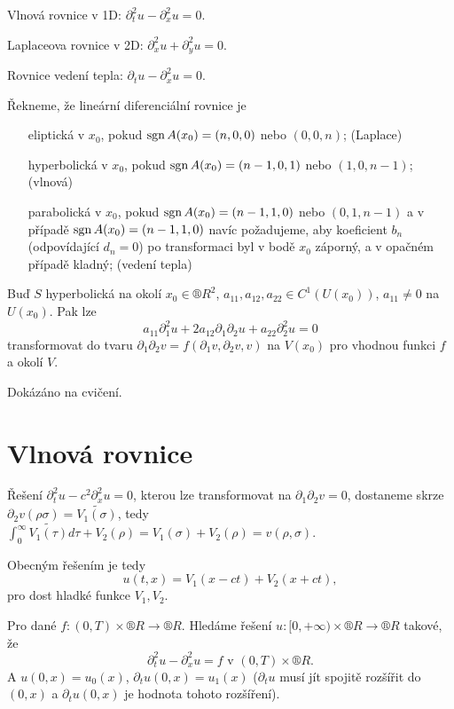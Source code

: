 \documentclass[12pt]{article}					%
\begin{document}
\begin{priklady}
	Vlnová rovnice v 1D: $\partial_t^2 u - \partial_x^2 u = 0$.

	Laplaceova rovnice v 2D: $\partial_x^2 u + \partial_y^2 u = 0$.

	Rovnice vedení tepla: $\partial_t u - \partial_x^2 u = 0$.
\end{priklady}

\begin{definice}
	Řekneme, že lineární diferenciální rovnice je
	\begin{itemize}
		\item[eliptická] v $x_0$, pokud $\operatorname{sgn} A(x_0) = (n, 0, 0)$ nebo $(0, 0, n)$; (Laplace)
		\item[hyperbolická] v $x_0$, pokud $\operatorname{sgn} A(x_0) = (n-1, 0, 1)$ nebo $(1, 0, n-1)$; (vlnová)
		\item[parabolická] v $x_0$, pokud $\operatorname{sgn} A(x_0) = (n-1, 1, 0)$ nebo $(0, 1, n-1)$ a v případě $\operatorname{sgn} A(x_0) = (n-1, 1, 0)$ navíc požadujeme, aby koeficient $b_n$ (odpovídající $d_n=0$) po transformaci byl v bodě $x_0$ záporný, a v opačném případě kladný; (vedení tepla)
	\end{itemize}
\end{definice}

\begin{veta}
	Buď $S$ hyperbolická na okolí $x_0 \in ®R^2$, $a_{11}, a_{12}, a_{22} \in C^1(U(x_0))$, $a_{11} ≠ 0$ na $U(x_0)$. Pak lze 
	$$ a_{11} \partial_1^2 u + 2a_{12} \partial_1\partial_2 u + a_{22} \partial_2^2 u = 0 $$
	transformovat do tvaru $\partial_1\partial_2 v = f(\partial_1v, \partial_2v, v)$ na $V(x_0)$ pro vhodnou funkci $f$ a okolí $V$.

	\begin{dukazin}
		Dokázáno na cvičení.
	\end{dukazin}
\end{veta}

\section{Vlnová rovnice}
\begin{tvrzeni}
	Řešení $\partial_t^2 u - c^2 \partial_x^2 u = 0$, kterou lze transformovat na $\partial_1\partial_2 v = 0$, dostaneme skrze $\partial_2 v(\rho \sigma) = \tilde{V_1(\sigma)}$, tedy $\int_0^∞ \tilde{V_1(\tau)} d\tau + V_2(\rho) = V_1(\sigma) + V_2(\rho) = v(\rho, \sigma)$.

	Obecným řešením je tedy
	$$ u(t, x) = V_1(x - ct) + V_2(x + ct), $$
	pro dost hladké funkce $V_1, V_2$.
\end{tvrzeni}

\begin{poznamka}
	Pro dané $f: (0, T) \times ®R \rightarrow ®R$. Hledáme řešení $u: [0, +∞) \times ®R \rightarrow ®R$ takové, že
	$$ \partial_t^2 u - \partial_x^2 u = f \text{ v } (0, T) \times ®R. $$
	A $u(0, x) = u_0(x)$, $\partial_t u(0, x) = u_1(x)$ ($\partial_t u$ musí jít spojitě rozšířit do $(0, x)$ a $\partial_t u(0, x)$ je hodnota tohoto rozšíření).
\end{poznamka}
\end{document}
